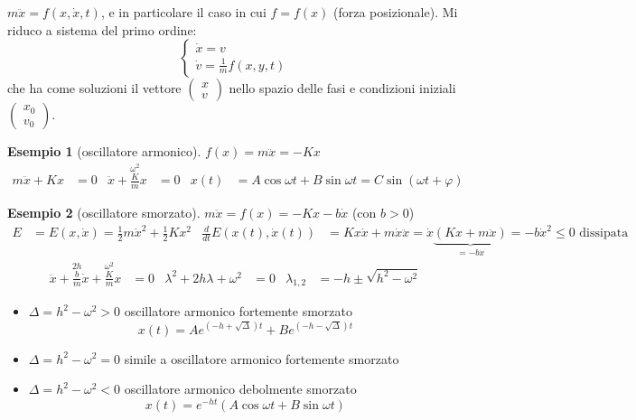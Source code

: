 \documentclass[a4paper,10pt]{article}
\theoremstyle{definition}
\newcommand{\cv}[2]{\begin{pmatrix} #1 \\ #2 \end{pmatrix}} %
\theoremstyle{indentdefinition}
\theoremstyle{indenttheorem}
\theoremstyle{myremark}
\newtheorem{example*}{Esempio}
\theoremstyle{indentgeneral}
\begin{document}
$m\ddot{x}=f\left(x,\dot{x},t\right)$, e in particolare il caso in
cui $f=f\left(x\right)$ (forza posizionale). Mi riduco a sistema del primo ordine: 
$$\begin{cases}
    \dot{x}=v\\
    \dot{v}=\frac{1}{m}f(x,y,t)
\end{cases}$$
che ha come soluzioni il vettore $\cv{x}{v}$ nello spazio delle fasi e condizioni iniziali $\cv{x_0}{v_0}$.
\begin{example*}[oscillatore armonico]
\label{exa:oscillatore-armonico}$f\left(x\right)=m\ddot{x}=-Kx$
\begin{align*}
m\ddot{x}+Kx & =0 & \ddot{x}+\overset{\omega^{2}}{\boxed{\frac{K}{m}}}x & =0 & x\left(t\right) & =A\cos\omega t+B\sin\omega t=C\sin(\omega t+\varphi)
\end{align*}
\end{example*}
%
\begin{example*}[oscillatore smorzato]
\label{exa:oscillatore-smorzato}$m\ddot{x}=f\left(x\right)=-Kx-b\dot{x}$
(con $b>0$)
\begin{align*}
E & =E\left(x,\dot{x}\right)=\frac{1}{2}m\dot{x}^{2}+\frac{1}{2}Kx^{2} & \frac{d}{dt}E(x(t),\dot{x}(t)) & =Kx\dot{x}+m\dot{x}\ddot{x}=\dot{x}\underbrace{\left(Kx+m\ddot{x}\right)}_{=-b\dot{x}}=-b\dot{x}^{2}\leq0  \text{ dissipata}
\end{align*}
\begin{align*}
\ddot{x}+\overset{2h}{\boxed{\frac{b}{m}}}\dot{x}+\overset{\omega^{2}}{\boxed{\frac{K}{m}}}x & =0 & \lambda^{2}+2h\lambda+\omega^{2} & =0 & \lambda_{1,2} & =-h\pm\sqrt{h^{2}-\omega^{2}}
\end{align*}
\end{example*}
\begin{itemize}
\item $\Delta=h^{2}-\omega^{2}>0$ oscillatore armonico fortemente smorzato
\[
x\left(t\right)=Ae^{\left(-h+\sqrt{\Delta}\right)t}+Be^{\left(-h-\sqrt{\Delta}\right)t}
\]
\item $\Delta=h^{2}-\omega^{2}=0$ simile a oscillatore armonico fortemente
smorzato
\item $\Delta=h^{2}-\omega^{2}<0$ oscillatore armonico debolmente smorzato
\[
x\left(t\right)=e^{-ht}\left(A\cos\omega t+B\sin\omega t\right)
\]
\end{itemize}
%
\end{document}
